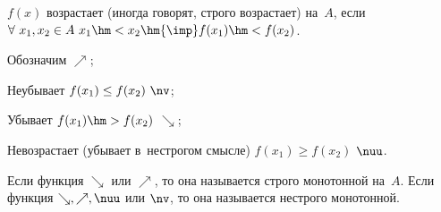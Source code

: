 \label{vrost}
        $f(x)$ возрастает (иногда говорят, строго возрастает) на~$A$, если $\forall\  x_1,x_2\in A\ x_1\hm<x_2\hm{\imp} f(x_1)\hm<f(x_2)$.

        Обозначим $\nearrow$;

        Неубывает $f(x_1)\leq f(x_2) \ \nv$;

        Убывает $f(x_1)\hm>f(x_2)$ $\searrow$;

        Невозрастает (убывает в~нестрогом смысле) $f(x_1)\geq f(x_2)$ $\nuu$.

        Если функция $\searrow$ или $\nearrow$, то она называется строго монотонной на~$A$. Если функция $\searrow,\nearrow,\nuu$ или $\nv$, то она называется нестрого монотонной.
    